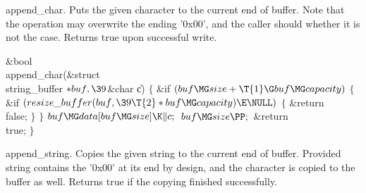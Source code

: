 append\_char.
Puts the given character to the current end of buffer. Note that the operation
may overwrite the ending '0x00', and
the caller should whether it is not the case. Returns true upon successful
write.

\Y\B\1\1\&{bool} \\{append\_char}(\&{struct} \\{string\_buffer} ${}{*}\\{buf},%
\39{}$\&{char} \|c)\2\2\6
${}\{{}$\1\6
\&{if} ${}(\\{buf}\MG\\{size}+\T{1}\G\\{buf}\MG\\{capacity}){}$\5
${}\{{}$\1\6
\&{if} ${}(\\{resize\_buffer}(\\{buf},\39\T{2}*\\{buf}\MG\\{capacity})\E%
\NULL){}$\5
${}\{{}$\1\6
\&{return} \\{false};\6
\4${}\}{}$\2\6
\4${}\}{}$\2\6
${}\\{buf}\MG\\{data}[\\{buf}\MG\\{size}]\K\|c;{}$\6
${}\\{buf}\MG\\{size}\PP;{}$\6
\&{return} \\{true};\6
\4${}\}{}$\2\par
\fi

append\_string.
Copies the given string to the current end of buffer. Provided string contains
the '0x00' at its end by design, and the
character is copied to the buffer as well. Returns true if the copying finished
successfully.

